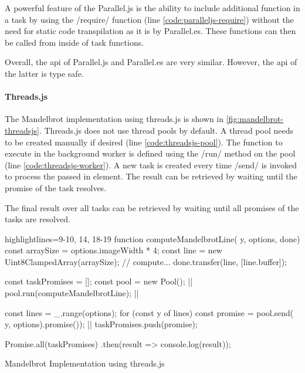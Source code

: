 A powerful feature of the Parallel.js is the ability to include additional function in a task by using the \javascriptinline/require/ function (line \ref{code:paralleljs-require}) without the need for static code transpilation as it is by Parallel.es. These functions can then be called from inside of task functions. 

Overall, the api of Parallel.js and Parallel.es are very similar. However, the api of the latter is type safe.


\paragraph{Threads.js}
 The Mandelbrot implementation using threads.js is shown in \cref{fig:mandelbrot-threadsjs}. Threads.js does not use thread pools by default. A thread pool needs to be created manually if desired (line \ref{code:threadsjs-pool}). The function to execute in the background worker is defined using the \javascriptinline/run/ method on the pool (line \ref{code:threadsjs-worker}). A new task is created every time \javascriptinline/send/ is invoked to process the passed in element. The result can be retrieved by waiting until the promise of the task resolves. 
 
The final result over all tasks can be retrieved by waiting until all promises of the tasks are resolved.


\begin{listing}
	\begin{javascriptcode*}{highlightlines={9-10, 14, 18-19}}
function computeMandelbrotLine({ y, options}, done) {
	const arraySize = options.imageWidth * 4;
	const line = new Uint8ClampedArray(arraySize);
	// compute...
	done.transfer(line, [line.buffer]);
}

const taskPromises = [];
const pool = new Pool(); |$\label{code:threadsjs-pool}$|
pool.run(computeMandelbrotLine); |$\label{code:threadsjs-worker}$|

const lines = _.range(options);
for (const y of lines) {
	const promise = pool.send({ y, options}).promise()); |$\label{code:threadsjs-messaging}$|
	taskPromises.push(promise);
}

Promise.all(taskPromises)
	.then(result => console.log(result));	
\end{javascriptcode*}
\caption{Mandelbrot Implementation using threads.js}
\label{fig:mandelbrot-threadsjs}
\end{listing}

